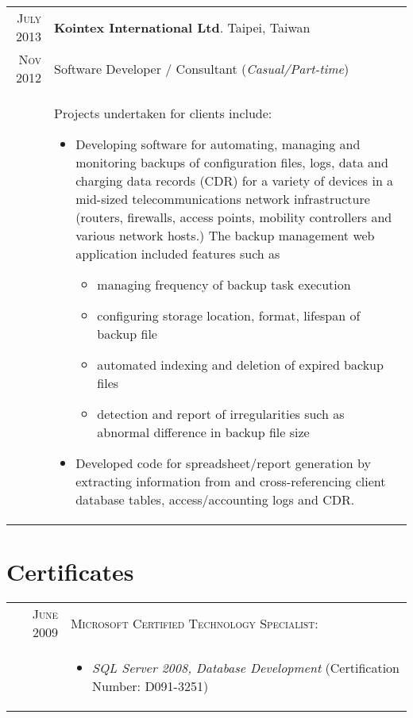 \documentclass[a4paper,10pt]{article} %
\begin{document}
\begin{longtable}{r|p{13.8cm}}
  \textsc{July 2013} & \textbf{Kointex International Ltd}.  \hfill Taipei, Taiwan\\
  \textsc{Nov 2012}  & Software Developer / Consultant      \hfill (\emph{Casual/Part-time})\\
  & \footnotesize{
      Projects undertaken for clients include:
      \begin{itemize}
        \item Developing software for automating, managing and monitoring backups of 
          configuration files, logs, data and charging data records (CDR) for a variety of 
          devices in a mid-sized telecommunications network infrastructure (routers, firewalls, 
          access points, mobility controllers and various network hosts.)
          The backup management web application included features such as 
          \begin{itemize}
            \item managing frequency of backup task execution
            \item configuring storage location, format, lifespan of backup file
            \item automated indexing and deletion of expired backup files
            \item detection and report of irregularities such as abnormal difference 
              in backup file size 
          \end{itemize}
        \item Developed code for spreadsheet/report generation by extracting information 
          from and cross-referencing client database tables, access/accounting logs and CDR.
      \end{itemize}
    }
\end{longtable}


\section{Certificates}

\begin{tabular}{rl}

\textsc{June} 2009 	&\textsc{Microsoft Certified Technology Specialist:} \\ 
				& \parbox{0.9\textwidth}{
				\begin{itemize}
				\item	\emph{SQL Server 2008, Database Development} (Certification Number: D091-3251)
				\end{itemize}
				 }

\end{tabular}
\end{document}
